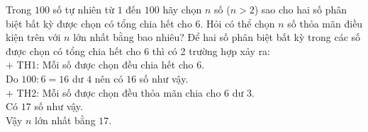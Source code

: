 \begin{ex}%
	Trong $ 100 $ số tự nhiên từ $ 1 $ đến $100 $ hãy chọn $ n $ số ($n>2  $) sao cho hai số phân biệt bất kỳ được chọn có tổng chia hết cho $ 6 $. Hỏi có thể chọn $ n $ số thỏa mãn điều kiện trên với $ n $ lớn nhất bằng bao nhiêu?
	\loigiai
	{ Để hai số phân biệt bất kỳ trong các số được chọn có tổng chia hết cho $ 6 $ thì có 2 trường hợp xảy ra:
		\\+ TH1: Mỗi số được chọn đều chia hết cho $ 6 $.
		\\ Do $ 100:6=16 $ dư $ 4 $ nên có $ 16  $ số như vậy.
		\\ + TH2:  Mỗi số được chọn đều thỏa mãn chia cho $ 6 $ dư $ 3 $.
		\\ Có $ 17 $ số như vậy.
		\\ Vậy $ n $ lớn nhất bằng $ 17 $.
	}
\end{ex}

